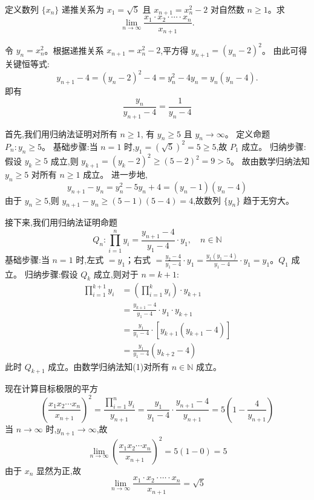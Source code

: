 \begin{questions}
    \question 定义数列 $\{x_n\}$ 递推关系为 $x_1 = \sqrt{5}$ 且 $x_{n+1} = x_n^2 - 2$ 对自然数 $n \ge 1$。求
    \[
    \lim_{n \to \infty} \frac{x_1 \cdot x_2 \cdot \cdots \cdot x_n}{x_{n+1}}.
    \]
    \begin{solution}
        令 $y_n = x_n^2$。根据递推关系 $x_{n+1} = x_n^2 - 2$,平方得 $y_{n+1} = (y_n - 2)^2$。
        由此可得关键恒等式:
        \[
        y_{n+1} - 4 = (y_n - 2)^2 - 4 = y_n^2 - 4y_n = y_n(y_n - 4).
        \]
        即有 
        \[
        \frac{y_n}{y_{n+1}-4} = \frac{1}{y_n-4}
        \]

        首先,我们用归纳法证明对所有 $n \ge 1$, 有 $y_n \ge 5$ 且 $y_n \to \infty$。
        定义命题 $P_n: y_n \ge 5$。
        基础步骤:当 $n=1$ 时,$y_1 = (\sqrt{5})^2 = 5 \ge 5$,故 $P_1$ 成立。
        归纳步骤:假设 $y_k \ge 5$ 成立,则 $y_{k+1} = (y_k - 2)^2 \ge (5-2)^2 = 9 > 5$。
        故由数学归纳法知 $y_n \ge 5$ 对所有 $n \ge 1$ 成立。
        进一步地,
        \[
        y_{n+1} - y_n = y_n^2 - 5y_n + 4 = (y_n - 1)(y_n - 4)
        \]
        由于 $y_n \ge 5$,则 $y_{n+1} - y_n \ge (5-1)(5-4) = 4$,故数列 $\{y_n\}$ 趋于无穷大。

        接下来,我们用归纳法证明命题 
        \[
        Q_n: \prod_{i=1}^n y_i = \frac{y_{n+1}-4}{y_1-4} \cdot y_1, \quad n \in \mathbb{N}\tag{1}
        \]
        基础步骤:当 $n=1$ 时,左式 $= y_1$；右式 $= \frac{y_2-4}{y_1-4} \cdot y_1 = \frac{y_1(y_1-4)}{y_1-4} \cdot y_1 = y_1$。$Q_1$ 成立。
        归纳步骤:假设 $Q_k$ 成立,则对于 $n=k+1$:
        \begin{align}
        \prod_{i=1}^{k+1} y_i &= \left( \prod_{i=1}^{k} y_i \right) \cdot y_{k+1} \\
        &= \frac{y_{k+1}-4}{y_1-4} \cdot y_1 \cdot y_{k+1} \\
        &= \frac{y_1}{y_1-4} \cdot [y_{k+1}(y_{k+1}-4)] \\
        &= \frac{y_1}{y_1-4} (y_{k+2}-4)
        \end{align}
        此时 $Q_{k+1}$ 成立。由数学归纳法知(1)对所有 $n \in \mathbb{N}$ 成立。

        现在计算目标极限的平方
        \[
        \left( \frac{x_1 x_2 \cdots x_n}{x_{n+1}} \right)^2 = \frac{\prod_{i=1}^n y_i}{y_{n+1}} 
        = \frac{y_1}{y_1-4} \cdot \frac{y_{n+1}-4}{y_{n+1}} 
        = 5 \left( 1 - \frac{4}{y_{n+1}} \right)
        \]
        当 $n \to \infty$ 时,$y_{n+1} \to \infty$,故
        \[
        \lim_{n \to \infty} \left( \frac{x_1 x_2 \cdots x_n}{x_{n+1}} \right)^2 = 5(1 - 0) = 5
        \]
        由于 $x_n$ 显然为正,故
        \[
        \lim_{n \to \infty} \frac{x_1 \cdot x_2 \cdot \cdots \cdot x_n}{x_{n+1}} = \sqrt{5}
        \]
    \end{solution}


\end{questions}
